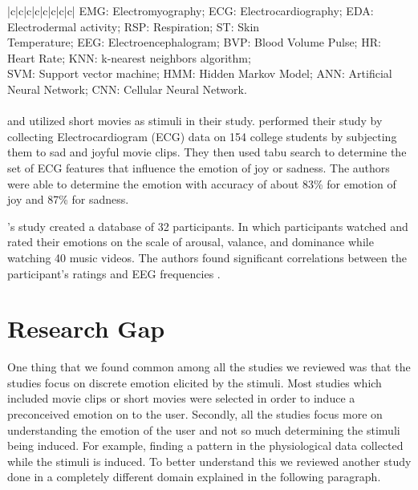 \begin{center}
{\begin{tabular}{ |c|c|c|c|c|c|c|c| }
\hline
{} {EMG: Electromyography; ECG: Electrocardiography; EDA: Electrodermal activity; RSP: Respiration; ST: Skin } \\
 {Temperature; EEG: Electroencephalogram; BVP: Blood Volume Pulse; HR: Heart Rate; KNN: k-nearest neighbors algorithm;} \\
 {SVM: Support vector machine; HMM: Hidden Markov Model; ANN: Artificial Neural Network; CNN: Cellular Neural Network.} \\
\hline
\end{tabular}}
\label{tab:lr_emotional recognition}
\end{center}
\newpage

\paragraph{} \citeauthor{w_wen_2014} \cite{w_wen_2014} \cite{wan_wen_2009} and \citeauthor{koelstra_deap:_2012} \cite{koelstra_deap:_2012} utilized short movies as stimuli in their study. \citeauthor{wan_wen_2009} performed their study by collecting Electrocardiogram (ECG) data on 154 college students by subjecting them to sad and joyful movie clips. They then used tabu search to determine the set of ECG features that influence the emotion of joy or sadness. The authors were able to determine the emotion with accuracy of about 83\% for emotion of joy and 87\% for sadness.

\citeauthor{koelstra_deap:_2012}'s study created a database of 32 participants. In which participants watched and rated their emotions on the scale of arousal, valance, and dominance while watching 40 music videos. The authors found significant correlations between the participant's ratings and EEG frequencies \cite{koelstra_deap:_2012}. 

\section{Research Gap} One thing that we found common among all the studies we reviewed was that the studies focus on discrete emotion elicited by the stimuli. Most studies which included movie clips or short movies were selected in order to induce a preconceived emotion on to the user. Secondly, all the studies focus more on understanding the emotion of the user and not so much determining the stimuli being induced. For example, finding a pattern in the physiological data collected while the stimuli is induced. To better understand this we reviewed another study done in a completely different domain explained in the following paragraph.

